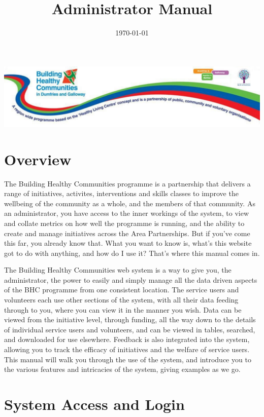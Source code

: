 \documentclass{bhcguides}
\begin{document}
\title{Administrator Manual}
\includegraphics[width=1.0\textwidth]{BHCbanner.png}
\date{\today}
\maketitle

\tableofcontents

\section{Overview}

The Building Healthy Communities programme is a partnership that delivers a range of initiatives, activites, interventions and skills classes to improve the wellbeing of the community as a whole, and the members of that community. As an administrator, you have access to the inner workings of the system, to view and collate metrics on how well the programme is running, and the ability to create and manage initiatives across the Area Partnerships. But if you've come this far, you already know that. What you want to know is, what's this website got to do with anything, and how do I use it? That's where this manual comes in.

The Building Healthy Communities web system is a way to give you, the administrator, the power to easily and simply manage all the data driven aspects of the BHC programme from one consistent location. The service users and volunteers each use other sections of the system, with all their data feeding through to you, where you can view it in the manner you wish. Data can be viewed from the initiative level, through funding, all the way down to the details of individual service users and volunteers, and can be viewed in tables, searched, and downloaded for use elsewhere. Feedback is also integrated into the system, allowing you to track the efficacy of initiatives and the welfare of service users. This manual will walk you through the use of the system, and introduce you to the various features and intricacies of the system, giving examples as we go.

\section{System Access and Login}
\label{sec:syslogin}
\end{document}
